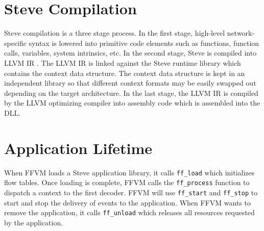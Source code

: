 \section{Steve Compilation} \label{compile}

Steve compilation is a three stage process.
In the first stage, high-level network-specific syntax is lowered into primitive code elements such as functions, function calls, variables, system intrinsics, etc.
In the second stage, Steve is compiled into LLVM IR \cite{llvm_webpage}. The LLVM IR is linked against the Steve runtime library which contains the context data structure. The context data structure is kept in an independent library so that different context formats may be easily swapped out depending on the target architecture.
In the last stage, the LLVM IR is compiled by the LLVM optimizing compiler into assembly code which is assembled into the DLL.

\section{Application Lifetime} \label{lifetime}

When FFVM loads a Steve application library, it calls \texttt{ff\_load} which initializes flow tables. Once loading is complete, FFVM calls the \texttt{ff\_process} function to dispatch a context to the first decoder. 
FFVM will use \texttt{ff\_start} and \texttt{ff\_stop} to start and stop the delivery of events to the application.
When FFVM wants to remove the application, it calls \texttt{ff\_unload} which releases all resources requested by the application.